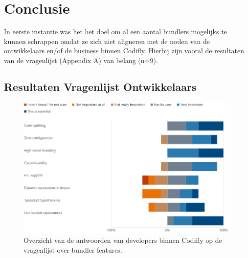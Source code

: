 
\chapter{Conclusie}
\label{ch:conclusie}


In eerste instantie was het het doel om al een aantal bundlers mogelijks te kunnen schrappen omdat ze zich niet aligneren met de noden van de ontwikkelaars en/of de business binnen Codifly. Hierbij zijn vooral de resultaten van de vragenlijst (Appendix A) van belang (n=9).

\section{Resultaten Vragenlijst Ontwikkelaars}

\begin{figure}[!htp]
  \includegraphics[width=\linewidth]{bachproef/img/graph-developers.png}
  \caption{Overzicht van de antwoorden van developers binnen Codifly op de vragenlijst over bundler features.}
  \label{fig:Devquestionnaire}
\end{figure}


